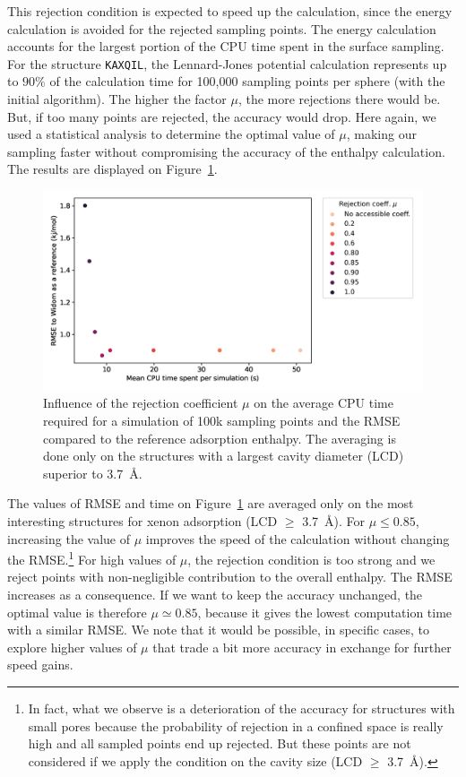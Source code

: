 \documentclass[main]{subfiles}
\begin{document}
This rejection condition is expected to speed up the calculation, since the energy calculation is avoided for the rejected sampling points. The energy calculation accounts for the largest portion of the CPU time spent in the surface sampling. For the structure \texttt{KAXQIL}\autocite{Banerjee_2012}, the Lennard-Jones potential calculation represents up to $90\%$ of the calculation time for 100,000 sampling points per sphere (with the initial algorithm). The higher the factor $\mu$, the more rejections there would be. But, if too many points are rejected, the accuracy would drop. Here again, we used a statistical analysis to determine the optimal value of $\mu$, making our sampling faster without compromising the accuracy of the enthalpy calculation. The results are displayed on Figure~\ref{fgr:rejection}.

\begin{figure}[ht]
\centering
  \includegraphics[width=0.7\linewidth]{figures/3-fastsim/rejection_coeff_optimisation.png}
  \caption{Influence of the rejection coefficient $\mu$ on the average CPU time required for a simulation of 100k sampling points and the RMSE compared to the reference adsorption enthalpy. The averaging is done only on the structures with a largest cavity diameter (LCD) superior to \SI{3.7}{\angstrom}. }\label{fgr:rejection}
\end{figure}

The values of RMSE and time on Figure~\ref{fgr:rejection} are averaged only on the most interesting structures for xenon adsorption (LCD $\geq$ \SI{3.7}{\angstrom}). For $\mu\leq 0.85$, increasing the value of $\mu$ improves the speed of the calculation without changing the RMSE.\footnote{In fact, what we observe is a deterioration of the accuracy for structures with small pores because the probability of rejection in a confined space is really high and all sampled points end up rejected. But these points are not considered if we apply the condition on the cavity size (LCD $\geq$ \SI{3.7}{\angstrom}).} For high values of $\mu$, the rejection condition is too strong and we reject points with non-negligible contribution to the overall enthalpy. The RMSE increases as a consequence. If we want to keep the accuracy unchanged, the optimal value is therefore $\mu \simeq 0.85$, because it gives the lowest computation time with a similar RMSE. We note that it would be possible, in specific cases, to explore higher values of $\mu$ that trade a bit more accuracy in exchange for further speed gains.
\end{document}
